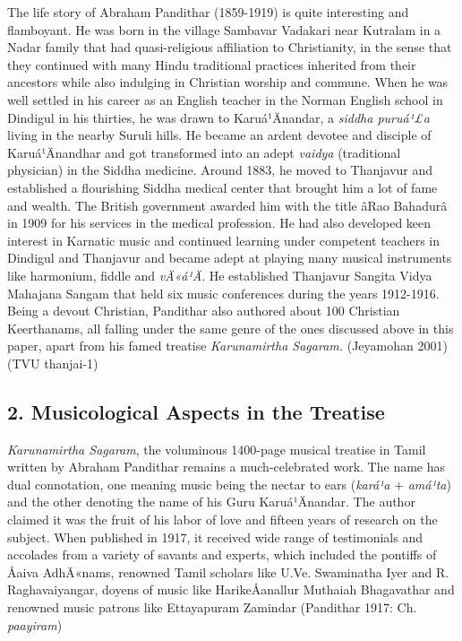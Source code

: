 The life story of Abraham Pandithar (1859-1919) is quite interesting and flamboyant. He was born in the village Sambavar Vadakari near Kutralam in a Nadar family that had quasi-religious affiliation to Christianity, in the sense that they continued with many Hindu traditional practices inherited from their ancestors while also indulging in Christian worship and commune. When he was well settled in his career as an English teacher in the Norman English school in Dindigul in his thirties, he was drawn to Karuá¹Änandar, a \textit{siddha puruá¹£a} living in the nearby Suruli hills. He became an ardent devotee and disciple of Karuá¹Änandhar and got transformed into an adept \textit{vaidya} (traditional physician) in the Siddha medicine. Around 1883, he moved to Thanjavur and established a flourishing Siddha medical center that brought him a lot of fame and wealth. The British government awarded him with the title âRao Bahadurâ in 1909 for his services in the medical profession. He had also developed keen interest in Karnatic music and continued learning under competent teachers in Dindigul and Thanjavur and became adept at playing many musical instruments like harmonium, fiddle and \textit{vÄ«á¹Ä}. He established Thanjavur Sangita Vidya Mahajana Sangam that held six music conferences during the years 1912-1916. Being a devout Christian, Pandithar also authored about 100 Christian Keerthanams, all falling under the same genre of the ones discussed above in this paper, apart from his famed treatise \textit{Karunamirtha Sagaram.} (Jeyamohan 2001) (TVU thanjai-1)

\vspace{-.2cm}

\subsection*{2. Musicological Aspects in the Treatise}

\vspace{-.2cm}

\textit{Karunamirtha Sagaram}, the voluminous 1400-page musical treatise in Tamil written by Abraham Pandithar remains a much-celebrated work. The name has dual connotation, one meaning music being the nectar to ears (\textit{kará¹a} + \textit{amá¹ta}) and the other denoting the name of his Guru Karuá¹Änandar. The author claimed it was the fruit of his labor of love and fifteen years of research on the subject. When published in 1917, it received wide range of testimonials and accolades from a variety of savants and experts, which included the pontiffs of Åaiva AdhÄ«nams, renowned Tamil scholars like U.Ve. Swaminatha Iyer and R. Raghavaiyangar, doyens of music like HarikeÅanallur Muthaiah Bhagavathar and renowned music patrons like Ettayapuram Zamindar (Pandithar 1917: Ch. \textit{paayiram})

